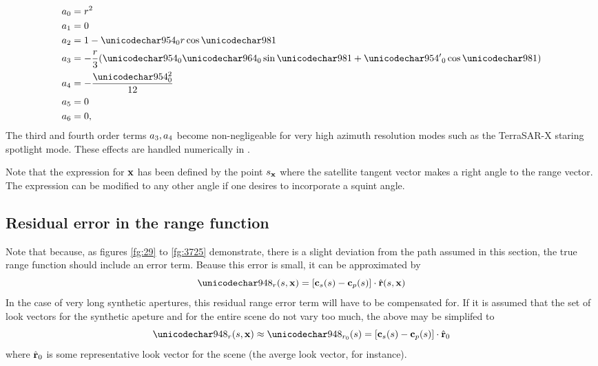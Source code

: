 \begin{align}
 \rcoeff_0 &= \targetrange^{2}\\
 \rcoeff_1 &= 0\\
 \rcoeff_2 &= 1 - \kappa_0\targetrange\cos\targetdepression\\
 \rcoeff_3 &= -\frac{\targetrange}{3}(\kappa_0\tau_0\sin\targetdepression + {\kappa'}_0\cos\targetdepression)\\
 \rcoeff_4 &= -\frac{\kappa_0^2}{12}\\
 \rcoeff_5 &= 0\\
 \rcoeff_6 &= 0,
\end{align}
The third and fourth order terms $a_3,a_4$ become non-negligeable for very high azimuth resolution modes such as the TerraSAR-X staring spotlight mode. These effects are handled numerically in \cite{PratsIraola2014}.
\par
Note that the expression for $\mathbf{\mathbf{x}}$ has been defined by the point $s_{\mathbf{x}}$ where the satellite tangent vector makes a right angle to the range vector. The expression can be modified to any other angle if one desires to incorporate a squint angle.
\subsection{Residual error in the range function}
Note that because, as figures \ref{fg:29} to \ref{fg:3725} demonstrate, there is a slight deviation from the path assumed in this section, the true range function should include an error term. Beause this error is small, it can be approximated by
\begin{equation}
 \rangeError(\parm, \vct\target) = [\sats(\parm)-\satp(\parm)]\cdot\uRangeVectorParm
\end{equation}
In the case of very long synthetic apertures, this residual range error term will have to be compensated for. If it is assumed that the set of look vectors for the synthetic apeture and for the entire scene do not vary too much, the above may be simplifed to
\begin{equation}
 \rangeError(\parm, \vct\target) \approx \rangeErrorZero(\parm) = [\sats(\parm)-\satp(\parm)]\cdot\uRangeVectorParmZero
\end{equation}
where $\hat{\mathbf{r}}_0$ is some representative look vector for the scene (the averge look vector, for instance).
